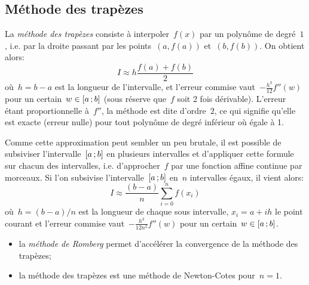 \subsection{Méthode des trapèzes} 
La \emph{méthode des trapèzes} consiste à interpoler~$f(x)$ par un polynôme de degré~$1$, i.e. par la droite passant par les points~$(a,f(a))$ et~$(b,f(b))$. On obtient alors: 
\begin{equation}
 I\approx h\dfrac{f(a)+f(b)}2
\end{equation}
où~$h=b-a$ est la longueur de l'intervalle, et l'erreur commise vaut~$-\frac{h^3}{12} f''(w)$ pour un certain~$w\in\mathopen{[}a\,;b\mathclose{]}$ (sous réserve que~$f$ soit 2 fois dérivable). L'erreur étant proportionnelle à~$f''$, la méthode est dite d'ordre~$2$, ce qui signifie qu'elle est exacte (erreur nulle) pour tout polynôme de degré inférieur où égale à 1. 

Comme cette approximation peut sembler un peu brutale, il est possible de subsiviser l'intervalle~$\mathopen{[}a\,;b\mathclose{]}$ en plusieurs intervalles et d'appliquer cette formule sur chacun des intervalles, i.e. d'approcher~$f$ par une fonction affine continue par morceaux. Si l'on subsivise l'intervalle~$\mathopen{[}a\,;b\mathclose{]}$ en~$n$ intervalles égaux, il vient alors: 
\begin{equation}
I\approx \frac{(b-a)}{n}\sum_{i=0}^{n}f(x_i)
\end{equation}
où~$h=(b-a)/n$ est la longueur de chaque sous intervalle, $x_i=a+ih$ le point courant et l'erreur commise vaut~$-\frac{h^3}{12n^2} f''(w)$ pour un certain~$w\in\mathopen{[}a\,;b\mathclose{]}$. 
\begin{remarque}[Remarques]\mbox{}
\begin{itemize}
\item la \emph{méthode de Romberg} permet d'accélérer la convergence de la méthode des trapèzes;
\item la méthode des trapèzes est une méthode de Newton-Cotes pour~$n=1$. 
\end{itemize}
\end{remarque} 
